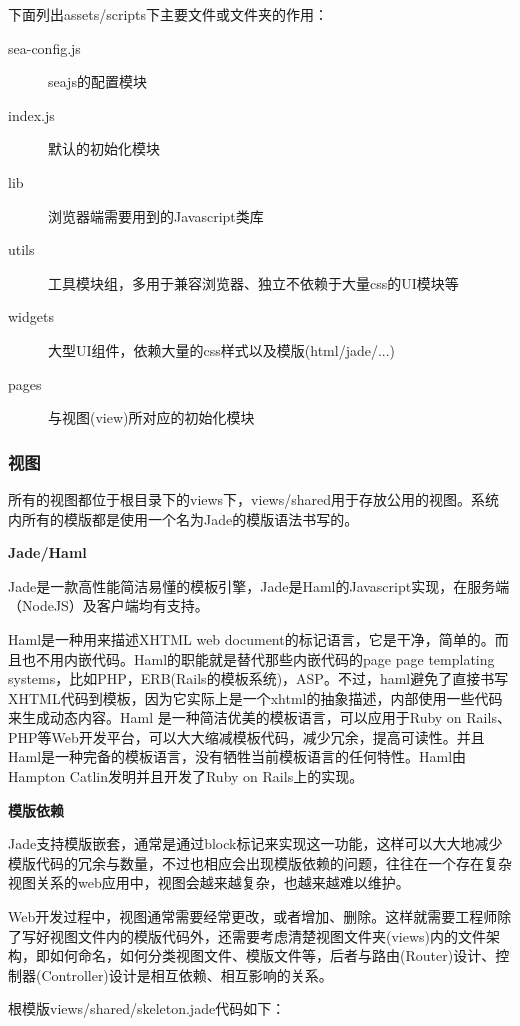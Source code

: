 \noindent
下面列出assets/scripts下主要文件或文件夹的作用：
\begin{description}
	\item[sea-config.js] seajs的配置模块
	\item[index.js] 默认的初始化模块
	\item[lib] 浏览器端需要用到的Javascript类库
	\item[utils] 工具模块组，多用于兼容浏览器、独立不依赖于大量css的UI模块等
	\item[widgets] 大型UI组件，依赖大量的css样式以及模版(html/jade/...)
	\item[pages] 与视图(view)所对应的初始化模块
\end{description}

\subsubsection{视图}
所有的视图都位于根目录下的views下，views/shared用于存放公用的视图。系统内所有的模版都是使用一个名为Jade的模版语法书写的。

\textbf{Jade/Haml}
\par
Jade是一款高性能简洁易懂的模板引擎，Jade是Haml的Javascript实现，在服务端（NodeJS）及客户端均有支持。

\indent
Haml是一种用来描述XHTML web document的标记语言，它是干净，简单的。而且也不用内嵌代码。Haml的职能就是替代那些内嵌代码的page page templating systems，比如PHP，ERB(Rails的模板系统)，ASP。不过，haml避免了直接书写XHTML代码到模板，因为它实际上是一个xhtml的抽象描述，内部使用一些代码来生成动态内容。Haml 是一种简洁优美的模板语言，可以应用于Ruby on Rails、 PHP等Web开发平台，可以大大缩减模板代码，减少冗余，提高可读性。并且Haml是一种完备的模板语言，没有牺牲当前模板语言的任何特性。Haml由Hampton Catlin发明并且开发了Ruby on Rails上的实现。

\textbf{模版依赖}
\par
Jade支持模版嵌套，通常是通过block标记来实现这一功能，这样可以大大地减少模版代码的冗余与数量，不过也相应会出现模版依赖的问题，往往在一个存在复杂视图关系的web应用中，视图会越来越复杂，也越来越难以维护。

\indent
Web开发过程中，视图通常需要经常更改，或者增加、删除。这样就需要工程师除了写好视图文件内的模版代码外，还需要考虑清楚视图文件夹(views)内的文件架构，即如何命名，如何分类视图文件、模版文件等，后者与路由(Router)设计、控制器(Controller)设计是相互依赖、相互影响的关系。

\noindent
根模版views/shared/skeleton.jade代码如下：



